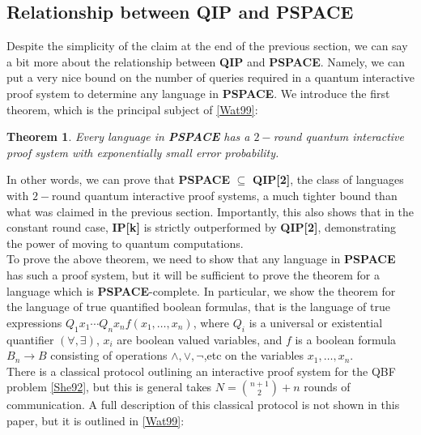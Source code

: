 \documentclass[12pt]{article}
\newtheorem*{thm}{Theorem}
\begin{document}
	\subsection{Relationship between QIP and PSPACE}
	Despite the simplicity of the claim at the end of the previous section, we can say a bit more about the relationship between \textbf{QIP} and \textbf{PSPACE}. Namely, we can put a very nice bound on the number of queries required in a quantum interactive proof system to determine any language in \textbf{PSPACE}. We introduce the first theorem, which is the principal subject of \hyperref[wat99]{[Wat99]}:
	\begin{thm}
		Every language in \textbf{PSPACE} has a $2-$round quantum interactive proof system with exponentially small error probability. 
	\end{thm}

	In other words, we can prove that \textbf{PSPACE} $\subseteq$ \textbf{QIP[2]}, the class of languages with $2-$round quantum interactive proof systems, a much tighter bound than what was claimed in the previous section. Importantly, this also shows that in the constant round case, \textbf{IP[k]} is strictly outperformed by \textbf{QIP[2]}, demonstrating the power of moving to quantum computations.\\
	
	To prove the above theorem, we need to show that any language in \textbf{PSPACE} has such a proof system, but it will be sufficient to prove the theorem for a language which is \textbf{PSPACE}-complete. In particular, we show the theorem for the language of true quantified boolean formulas, that is the language of true expressions $Q_1x_1\cdots Q_nx_nf(x_1,\dots,x_n)$, where $Q_i$ is a universal or existential quantifier $(\forall,\exists)$, $x_i$ are boolean valued variables, and $f$ is a boolean formula $B_n\to B$ consisting of operations $\wedge,\vee,\neg$,etc on the variables $x_1,\dots,x_n$. \\
	
	There is a classical protocol outlining an interactive proof system for the QBF problem \hyperref[she92]{[She92]}, but this is general takes $N={{n+1}\choose{2}}+n$ rounds of communication. A full description of this classical protocol is not shown in this paper, but it is outlined in \hyperref[wat99]{[Wat99]}:
	
\end{document}
